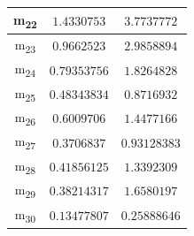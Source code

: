 \documentclass[12pt]{article}
\begin{document}
\begin{table}
\begin{tabular}{||c c c||}
			\hline
			m\textsubscript{22} & $1.4330753$ & $3.7737772$ \\
			\hline
			m\textsubscript{23} & $0.9662523$ & $2.9858894$ \\
			\hline
			m\textsubscript{24} & $0.79353756$ & $1.8264828$ \\
			\hline
			m\textsubscript{25} & $0.48343834$ & $0.8716932$ \\
			\hline
			m\textsubscript{26} & $0.6009706$ & $1.4477166$ \\
			\hline
			m\textsubscript{27} & $0.3706837$ & $0.93128383$ \\
			\hline
			m\textsubscript{28} & $0.41856125$ & $1.3392309$ \\
			\hline
			m\textsubscript{29} & $0.38214317$ & $1.6580197$ \\
			\hline
			m\textsubscript{30} & $0.13477807$ & $0.25888646$ \\
			\hline
		\end{tabular}
	\label{Tab:Features_3_1}
\end{table}
\end{document}
